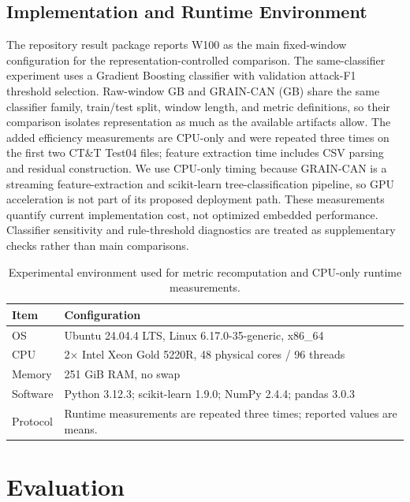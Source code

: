 \documentclass[runningheads]{llncs}
\newcommand{\method}{GRAIN-CAN}
\begin{document}
\subsection{Implementation and Runtime Environment}
The repository result package reports W100 as the main fixed-window configuration for the representation-controlled comparison. The same-classifier experiment uses a Gradient Boosting classifier with validation attack-F1 threshold selection. Raw-window GB and \method{} (GB) share the same classifier family, train/test split, window length, and metric definitions, so their comparison isolates representation as much as the available artifacts allow. The added efficiency measurements are CPU-only and were repeated three times on the first two CT\&T Test04 files; feature extraction time includes CSV parsing and residual construction. We use CPU-only timing because \method{} is a streaming feature-extraction and scikit-learn tree-classification pipeline, so GPU acceleration is not part of its proposed deployment path. These measurements quantify current implementation cost, not optimized embedded performance. Classifier sensitivity and rule-threshold diagnostics are treated as supplementary checks rather than main comparisons.

\begin{table}[!htbp]
\centering
\caption{Experimental environment used for metric recomputation and CPU-only runtime measurements.}
\label{tab:environment}
\small
\setlength{\tabcolsep}{4pt}
\renewcommand{\arraystretch}{1.05}
\begin{tabularx}{\textwidth}{p{} X}
\toprule
Item & Configuration \\
\midrule
OS & Ubuntu 24.04.4 LTS, Linux 6.17.0-35-generic, x86\_64 \\
CPU & 2$\times$ Intel Xeon Gold 5220R, 48 physical cores / 96 threads \\
Memory & 251 GiB RAM, no swap \\
Software & Python 3.12.3; scikit-learn 1.9.0; NumPy 2.4.4; pandas 3.0.3 \\
Protocol & Runtime measurements are repeated three times; reported values are means. \\
\bottomrule
\end{tabularx}
\end{table}

\section{Evaluation}
\end{document}
